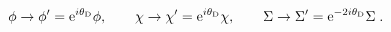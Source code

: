 \begin{equation}
 \phi \rightarrow \phi' = {\rm e}^{i\theta_{\rm D}}\phi, \qquad 
 \chi \rightarrow \chi' = {\rm e}^{i\theta_{\rm D}}\chi, \qquad 
 \Sigma \rightarrow \Sigma'= {\rm e}^{-2i\theta_{\rm D}}\Sigma\;.  
\label{eq:globalU1D}
\end{equation}

